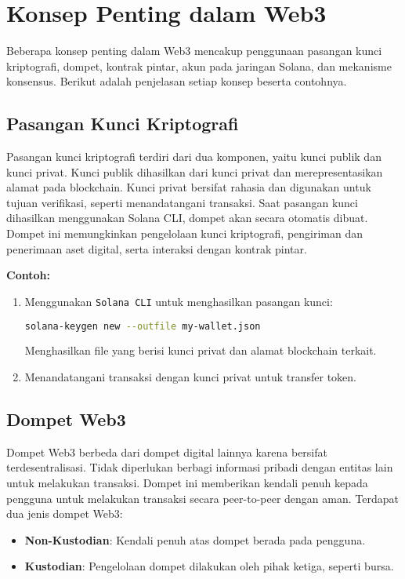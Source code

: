 \chapter{Konsep Penting dalam Web3}

Beberapa konsep penting dalam Web3 mencakup penggunaan pasangan kunci kriptografi, dompet, kontrak pintar, akun pada jaringan Solana, dan mekanisme konsensus. Berikut adalah penjelasan setiap konsep beserta contohnya.

\section{Pasangan Kunci Kriptografi}

Pasangan kunci kriptografi terdiri dari dua komponen, yaitu kunci publik dan kunci privat. Kunci publik dihasilkan dari kunci privat dan merepresentasikan alamat pada blockchain. Kunci privat bersifat rahasia dan digunakan untuk tujuan verifikasi, seperti menandatangani transaksi. Saat pasangan kunci dihasilkan menggunakan Solana CLI, dompet akan secara otomatis dibuat. Dompet ini memungkinkan pengelolaan kunci kriptografi, pengiriman dan penerimaan aset digital, serta interaksi dengan kontrak pintar.

\textbf{Contoh:}
\begin{enumerate}
	\item Menggunakan \texttt{Solana CLI} untuk menghasilkan pasangan kunci:
	\begin{lstlisting}[language=bash]
		solana-keygen new --outfile my-wallet.json
	\end{lstlisting}
	Menghasilkan file yang berisi kunci privat dan alamat blockchain terkait.
	\item Menandatangani transaksi dengan kunci privat untuk transfer token.
\end{enumerate}

\section{Dompet Web3}

Dompet Web3 berbeda dari dompet digital lainnya karena bersifat terdesentralisasi. Tidak diperlukan berbagi informasi pribadi dengan entitas lain untuk melakukan transaksi. Dompet ini memberikan kendali penuh kepada pengguna untuk melakukan transaksi secara peer-to-peer dengan aman. Terdapat dua jenis dompet Web3:
\begin{itemize}
	\item \textbf{Non-Kustodian}: Kendali penuh atas dompet berada pada pengguna.
	\item \textbf{Kustodian}: Pengelolaan dompet dilakukan oleh pihak ketiga, seperti bursa.
\end{itemize}

